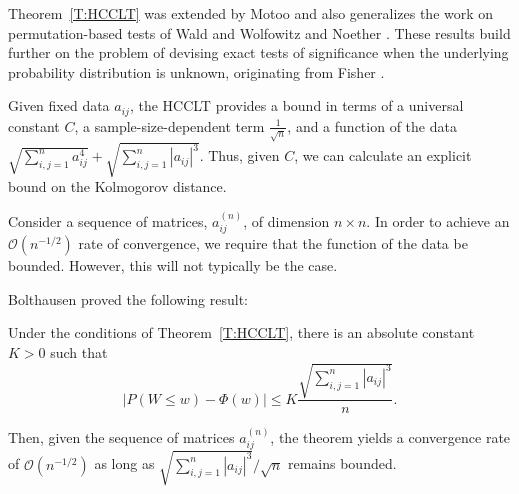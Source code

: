 Theorem~\ref{T:HCCLT} was extended by Motoo \cite{motoo1956hoeffding} and
also generalizes the work on permutation-based
tests of Wald and Wolfowitz \cite{wald1944statistical} and Noether
\cite{noether1949theorem}.  These results build further on the problem of
devising exact tests of significance when the underlying probability
distribution is unknown, originating from Fisher
\cite{fisher1935design, fisher1970statistical}.

Given fixed data $a_{ij}$, the HCCLT provides a bound in terms of a
universal constant $C$, a sample-size-dependent term
$\frac{1}{\sqrt{n}}$, and a function of the data $\sqrt{\sum_{i, j =
1}^{n} a_{ij}^4} + \sqrt{\sum_{i, j = 1}^{n} |a_{ij}|^3}$.  Thus,
given $C$, we can calculate an explicit bound on the Kolmogorov
distance.

Consider a sequence of matrices, $a_{ij}^{(n)}$, of dimension $n
\times n$.  In order to achieve an $\mathcal{O}(n^{-1/2})$ rate of
convergence, we require that the function of the data be bounded.
However, this will not typically be the case.

Bolthausen \cite{bolthausen1984estimate} proved the following result:
\begin{theorem}[Bolthausen]
  Under the conditions of Theorem~\ref{T:HCCLT}, there is an absolute constant
  $K > 0$ such that
  \begin{equation*}
    |P(W \leq w) - \Phi(w)| \leq K \frac{\sqrt{\sum_{i, j = 1}^{n} |a_{ij}|^3}}{n}.
  \end{equation*}
\end{theorem}

Then, given the sequence of matrices $a_{ij}^{(n)}$, the theorem
yields a convergence rate of $\mathcal{O}(n^{-1/2})$ as long as
$\sqrt{\sum_{i, j = 1}^{n} |a_{ij}|^3} / \sqrt{n}$ remains bounded.


